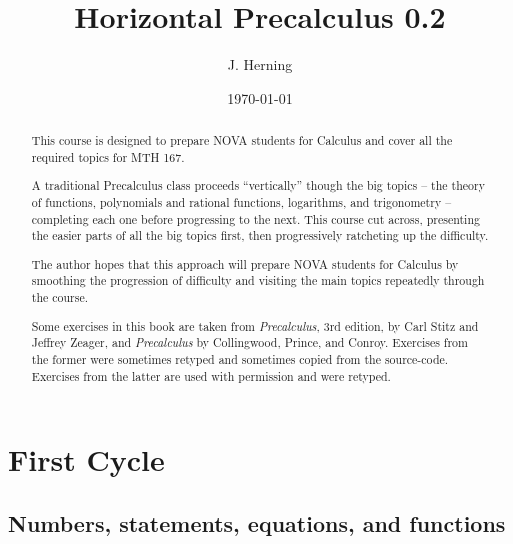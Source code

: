 \documentclass{amsbook}
\numberwithin{section}{chapter}
\numberwithin{equation}{chapter}
\begin{document}
\frontmatter

\title{Horizontal Precalculus 0.2}

\author{J. Herning}
\address{Northern Virginia Community College, Loudoun Campus}
\date{\today}

\begin{abstract} 
This course is designed to prepare NOVA students for Calculus and cover all the required topics for MTH 167.

A traditional Precalculus class proceeds ``vertically'' though the big topics -- the theory of functions, polynomials and rational functions, logarithms, and trigonometry -- completing each one before progressing to the next. This course cut across, presenting the easier parts of all the big topics first, then progressively ratcheting up the difficulty.

The author hopes that this approach will prepare NOVA students for Calculus by smoothing the progression of difficulty and visiting the main topics repeatedly through the course.

\bigskip
\noindent Some exercises in this book are taken from \textit{Precalculus}, 3rd edition, by Carl Stitz and Jeffrey Zeager, and \textit{Precalculus} by Collingwood, Prince, and Conroy. Exercises from the former were sometimes retyped and sometimes copied from the source-code. Exercises from the latter are used with permission and were retyped.


\bigskip
\doclicenseThis

\end{abstract}

\maketitle

\tableofcontents

\mainmatter

\chapter{First Cycle}

\section{Numbers, statements, equations, and functions}
\end{document}
